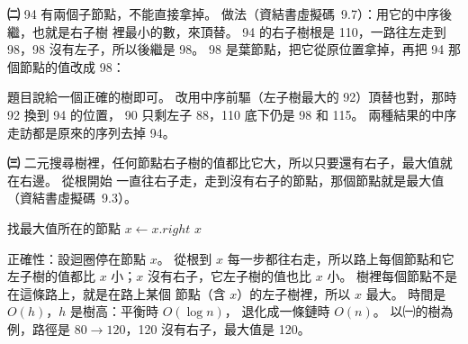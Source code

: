 \begin{pastsoln}
\textbf{㈡} 94 有兩個子節點，不能直接拿掉。 做法（資結書虛擬碼~9.7）：用它的中序後繼，也就是右子樹
裡最小的數，來頂替。 94 的右子樹根是 110，一路往左走到 98，98 沒有左子，所以後繼是 98。
98 是葉節點，把它從原位置拿掉，再把 94 那個節點的值改成 98：
\begin{center}
\end{center}
題目說給一個正確的樹即可。 改用中序前驅（左子樹最大的 92）頂替也對，那時 92 換到 94 的位置，
90 只剩左子 88，110 底下仍是 98 和 115。 兩種結果的中序走訪都是原來的序列去掉 94。

\textbf{㈢} 二元搜尋樹裡，任何節點右子樹的值都比它大，所以只要還有右子，最大值就在右邊。 從根開始
一直往右子走，走到沒有右子的節點，那個節點就是最大值（資結書虛擬碼~9.3）。
\begin{pseudo}{找最大值所在的節點}
 
        \State \Return \NIL {}
    \EndIf
        \State $x \gets x.\mathit{right}$
    \EndWhile
    \State \Return $x$
\EndFunction
\end{pseudo}
正確性：設迴圈停在節點 $x$。 從根到 $x$ 每一步都往右走，所以路上每個節點和它左子樹的值都比
$x$ 小；$x$ 沒有右子，它左子樹的值也比 $x$ 小。 樹裡每個節點不是在這條路上，就是在路上某個
節點（含 $x$）的左子樹裡，所以 $x$ 最大。 時間是 $O(h)$，$h$ 是樹高：平衡時 $O(\log n)$，
退化成一條鏈時 $O(n)$。 以㈠的樹為例，路徑是 $80 \to 120$，120 沒有右子，最大值是 120。
\end{pastsoln}
